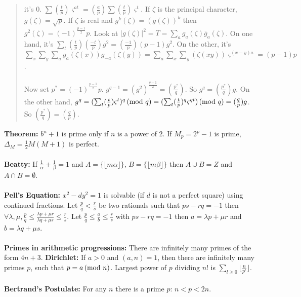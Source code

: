 \begin{quote}
it's $0$.
$\sum ({\frac t p}) \varsigma^{at}= ({\frac a p}) \sum ({\frac t p})
\varsigma^{t}$.
If $\zeta$ is the principal character, $g(\zeta)= {\sqrt p}$.  If $\zeta$ is
real
and $g^k(\zeta)= (g(\zeta))^k$ then $g^2(\zeta)= (-1)^{\frac {p-1} 2} p$.
Look at $|g(\zeta)|^2 = T = \sum_a
g_a (\zeta) {\overline g_a (\zeta)}$.  On one hand,
it's
$\sum_t ({\frac t p}) ({\frac {-t} p}) g^2 = ({\frac {-1} p}) (p-1) g^2$.
On the other, it's
$\sum_x \sum_y \sum_a g_a(\zeta(x)) g_{-a}(\zeta(y))=
\sum_a \sum_x \sum_y (\zeta(xy)) \varsigma^{(x-y)a} =(p-1)p$.
\\
\\
Now set $p^*= (-1)^{\frac {p-1} 2} p$.
$g^{q-1}= (g^2)^{\frac {q-1} 2}= ({\frac {p^*} q})$.
So $g^q= ({\frac {p^*} q}) g$.  On the other hand,
$g^q
= (\sum_t ({\frac t p}) \varsigma^{t})^q \thinspace \textnormal{(mod } q \textnormal{)}=
(\sum_t ({\frac t p})^q \varsigma^{qt}) \thinspace \textnormal{(mod } q \textnormal{)} =
({\frac q p}) g$.  So $({\frac {p^*} q}) = ({\frac q p})$.
\end{quote}
{\bf Theorem:}
$b^{n}+1$ is prime only if $n$ is a power of 2.
If $M_{p}= 2^{p}-1$ is prime, $\Delta_{M} = \frac {1}{2} M (M+1)$ is
perfect.
\\
\\
{\bf Beatty:} If ${\frac {1} {\alpha}} + {\frac {1} {\beta}} = 1$ and
$A= \{ \lfloor m \alpha \rfloor \}$,
$B= \{ \lfloor m \beta \rfloor \}$ then $A \cup B = Z$ and $A \cap B =
\emptyset$.
\\
\\
{\bf Pell's Equation:} $x^2 -d y^2 = 1$ is solvable
(if $d$ is not a perfect square) using
continued fractions.
Let ${\frac p q}<{\frac r s}$ be two rationals such that $ps-rq = -1$
then $\forall \lambda, \mu, {\frac p q} \leq
{\frac {\lambda p + \mu r} {\lambda q + \mu s}}
\leq {\frac r s}$.
Let ${\frac p q} \leq {\frac a b} \leq {\frac r s}$
with $ps-rq = -1$
then $a= {\lambda p + \mu r}$ and
$b= {\lambda q + \mu s}$.
\\
\\
{\bf Primes in arithmetic progressions:} There are infinitely many primes of the form $4n+3$.
{\bf Dirichlet:}  If $a>0$ and $(a,n)=1$, then there are infinitely many primes
$p$, such that $p = a \thinspace \textnormal{(mod } n \textnormal{)}$.
Largest power of $p$ dividing $n!$ is
$\sum_{l \geq 0} \lfloor {\frac {n} {p^l}} \rfloor$.
\\
\\
{\bf Bertrand's Postulate:} For any $n$ there is a prime $p$: $n < p < 2n$.
